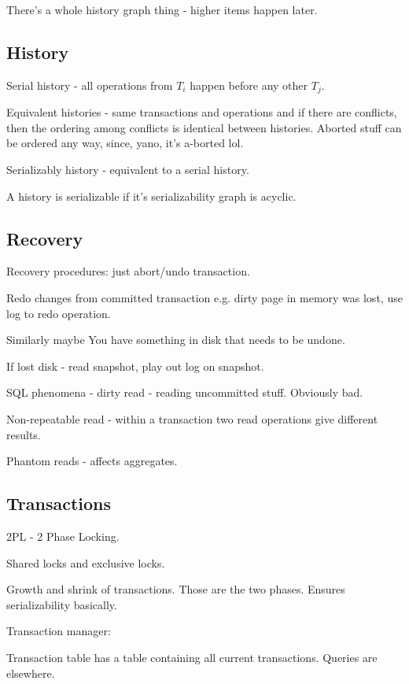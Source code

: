 \documentclass{article}
\begin{document}
		There's a whole history graph thing - higher items happen later.
		
	\subsection{History}
	
		Serial history - all operations from $T_i$ happen before any other $T_j$.
		
		Equivalent histories - same transactions and operations and if there are conflicts, then the ordering among conflicts is identical between histories. Aborted stuff can be ordered any way, since, yano, it's a-borted lol.
		
		Serializably history - equivalent to a serial history.
		
		A history is serializable if it's serializability graph is acyclic.
		
	\subsection{Recovery}
	
		Recovery procedures: just abort/undo transaction.
		
		Redo changes from committed transaction e.g. dirty page in memory was lost, use log to redo operation.
		
		Similarly maybe You have something in disk that needs to be undone.
		
		If lost disk - read snapshot, play out log on snapshot.
		
		SQL phenomena - dirty read - reading uncommitted stuff. Obviously bad.
		
		Non-repeatable read - within a transaction two read operations give different results.
		
		Phantom reads - affects aggregates. 
		
	\subsection{Transactions}
	
		2PL - 2 Phase Locking.
		
		Shared locks and exclusive locks.
		
		Growth and shrink of transactions. Those are the two phases. Ensures serializability basically.
		
		Transaction manager:
		
		Transaction table has a table containing all current transactions. Queries are elsewhere.
	
\end{document}

